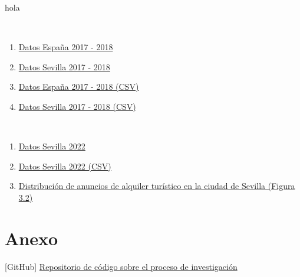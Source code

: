 \documentclass[a4paper,10pt]{article}
\begin{document}
            hola












    \clearpage
    \begin{thebibliography}{20}

            \ 
            \begin{enumerate}
                \item \href{https://datahippo.org/es/region/599216cb8a4655339b819813/}{Datos España 2017 - 2018}
                \item \href{https://datahippo.org/es/region/599230af8a46554edf884651/}{Datos Sevilla 2017 - 2018}
                \item \href{https://datahippo.org/media/regions/58612732-b2dc-433b-ab78-b8fbe5bbbb16/599216cb8a4655339b819813_airbnb.csv}{Datos España 2017 - 2018 (CSV)}
                \item \href{https://datahippo.org/media/regions/7e3f7365-8ec0-42f1-a277-9b82743b8a39/599230af8a46554edf884651_airbnb.csv}{Datos Sevilla 2017 - 2018 (CSV)}
            \end{enumerate}
        
            \
            \begin{enumerate}
                \item \href{http://insideairbnb.com/get-the-data/}{Datos Sevilla 2022}
                \item \href{http://data.insideairbnb.com/spain/andaluc%C3%ADa/sevilla/2023-03-31/visualisations/listings.csv}{Datos Sevilla 2022 (CSV)}
                \item \href{http://insideairbnb.com/sevilla}{Distribución de anuncios de alquiler turístico en la ciudad de Sevilla (Figura 3.2)}
            \end{enumerate}

    \end{thebibliography}
    
    \hypertarget{anexo}{}
    \section*{Anexo}

        \hypertarget{github}{[GitHub] \href{https://github.com/m7pantoja/TouristRental}{Repositorio de código sobre el proceso de investigación}}
\end{document}
